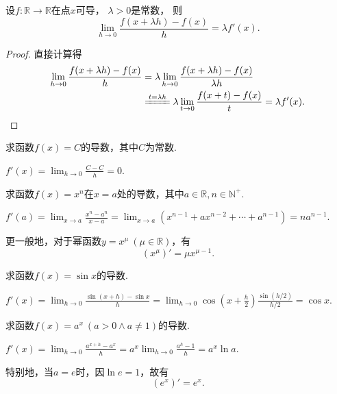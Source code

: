 \begin{proposition}
设\(f\colon\mathbb{R}\to\mathbb{R}\)在点\(x\)可导，
\(\lambda>0\)是常数，
则\[
	\lim_{h\to0} \frac{f(x+\lambda h)-f(x)}{h}
	= \lambda f'(x).
\]
\begin{proof}
直接计算得\begin{align*}
	\lim_{h\to0} \frac{f(x+\lambda h)-f(x)}{h}
	&= \lambda \lim_{h\to0} \frac{f(x+\lambda h)-f(x)}{\lambda h} \\
	&\xlongequal{t=\lambda h}
		\lambda \lim_{t\to0} \frac{f(x+t)-f(x)}{t}
	= \lambda f'(x).
	\qedhere
\end{align*}
\end{proof}
\end{proposition}

\begin{example}
求函数\(f(x) = C\)的导数，其中\(C\)为常数.
\begin{solution}
\(f'(x)
= \lim_{h\to0}\frac{C-C}{h}
= 0\).
\end{solution}
\end{example}

\begin{example}
求函数\(f(x) = x^n\)在\(x=a\)处的导数，其中\(a\in\mathbb{R},
n\in\mathbb{N}^+\).
\begin{solution}
\(f'(a)
= \lim_{x \to a}\frac{x^n-a^n}{x-a}
= \lim_{x \to a}(x^{n-1}+ax^{n-2}+\dotsb+a^{n-1})
= na^{n-1}\).
\end{solution}
\end{example}

更一般地，对于幂函数\(y=x^{\mu}\ (\mu\in\mathbb{R})\)，有\begin{equation}
	(x^{\mu})' = \mu x^{\mu-1}.
\end{equation}

\begin{example}
求函数\(f(x) = \sin x\)的导数.
\begin{solution}
\(f'(x) = \lim_{h\to0}\frac{\sin(x+h)-\sin x}{h}
= \lim_{h\to0}{\cos(x+\frac{h}{2}) \frac{\sin(h/2)}{h/2}}
= \cos x\).
\end{solution}
\end{example}

\begin{example}
求函数\(f(x) = a^x\ (a > 0 \land a \neq 1)\)的导数.
\begin{solution}
\(f'(x)
= \lim_{h\to0}\frac{a^{x+h}-a^x}{h}
= a^x \lim_{h\to0}\frac{a^h-1}{h}
= a^x \ln a\).
\end{solution}

特别地，当\(a=e\)时，因\(\ln e = 1\)，故有\[
	(e^x)' = e^x.
\]
\end{example}

